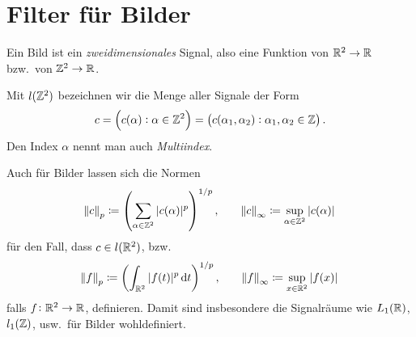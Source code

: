 \section{Filter für Bilder}

\begin{definition}[Bild]
Ein Bild ist ein \emph{zweidimensionales} Signal, also eine Funktion von $ \mathbb{R}^{2} \rightarrow \mathbb{R} $
bzw.\ von $ \mathbb{Z}^{2} \rightarrow \mathbb{R} $.
\end{definition}

\begin{definition}[Signalklassen]
Mit $ l(\mathbb{Z}^{2}) $ bezeichnen wir die Menge aller Signale der Form
\[
  c = \left( c(\alpha) : \alpha \in \mathbb{Z}^{2} \right) 
    = \left( c(\alpha_{1}, \alpha_{2}) : \alpha_{1}, \alpha_{2} \in \mathbb{Z} \right).
\]
Den Index $ \alpha $ nennt man auch \emph{Multiindex}.

Auch für Bilder lassen sich die Normen
\[
  \norm{c}_{p} \coloneqq \left( \sum_{\alpha \in \mathbb{Z}^{2}} |c(\alpha)|^{p} \right)^{1/p}, \qquad
  \norm{c}_{\infty} \coloneqq \sup_{\alpha \in \mathbb{Z}^{2}} |c(\alpha)|
\]
für den Fall, dass $ c \in l(\mathbb{R}^{2}) $, bzw.
\[
  \norm{f}_{p} \coloneqq \left( \int_{\R^{2}} |f(t)|^{p} \dif t \right)^{1/p}, \qquad
  \norm{f}_{\infty} \coloneqq \sup_{x \in \R^{2}} |f(x)|
\]
falls $ f \colon \mathbb{R}^{2} \rightarrow \mathbb{R} $, definieren. Damit sind insbesondere die Signalräume wie
$ L_{1}(\mathbb{R}) $, $ l_{1}(\mathbb{Z}) $, usw.\ für Bilder wohldefiniert.
\end{definition}

